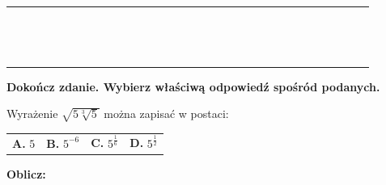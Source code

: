 \documentclass[12pt,a4paper]{article}
\theoremstyle{break}
\begin{document}
		\begin{tabular}{|p{0.1cm}|p{0.1cm}|p{0.1cm}|p{0.1cm}|p{0.1cm}|p{0.1cm}|p{0.1cm}|p{0.1cm}|p{0.1cm}|p{0.1cm}|p{0.1cm}|p{0.1cm}|p{0.1cm}|p{0.1cm}|p{0.1cm}|p{0.1cm}|p{0.1cm}|p{0.1cm}|p{0.1cm}|p{0.1cm}|p{0.1cm}|p{0.1cm}|p{0.1cm}|p{0.1cm}|p{0.1cm}|p{0.1cm}|p{0.1cm}|p{0.1cm}|p{0.1cm}|p{0.1cm}|p{0.1cm}|p{0.1cm}}
		\hline&&&&&&&&&&&&&&&&&&&&&&&&&&&&&&\\
		\hline&&&&&&&&&&&&&&&&&&&&&&&&&&&&&&\\
		\hline&&&&&&&&&&&&&&&&&&&&&&&&&&&&&&\\
		\hline&&&&&&&&&&&&&&&&&&&&&&&&&&&&&&\\
		\hline&&&&&&&&&&&&&&&&&&&&&&&&&&&&&&\\
		\hline&&&&&&&&&&&&&&&&&&&&&&&&&&&&&&\\
		\hline&&&&&&&&&&&&&&&&&&&&&&&&&&&&&&\\
		\hline&&&&&&&&&&&&&&&&&&&&&&&&&&&&&&\\
		\hline&&&&&&&&&&&&&&&&&&&&&&&&&&&&&&\\
		\hline&&&&&&&&&&&&&&&&&&&&&&&&&&&&&&\\
		\hline&&&&&&&&&&&&&&&&&&&&&&&&&&&&&&\\
		\hline&&&&&&&&&&&&&&&&&&&&&&&&&&&&&&\\
		\hline&&&&&&&&&&&&&&&&&&&&&&&&&&&&&&\\
		\hline&&&&&&&&&&&&&&&&&&&&&&&&&&&&&&\\
		\hline&&&&&&&&&&&&&&&&&&&&&&&&&&&&&&\\
		\hline
	\end{tabular}
	
	
	\begin{zad}[0-1]
		\textbf{Dokończ zdanie. Wybierz właściwą odpowiedź spośród podanych.}
	\end{zad} 
	
	Wyrażenie $\sqrt{5\sqrt[3]{5}}$ można zapisać w postaci:
	
	\vspace{0.5cm}
	\begin{tabular}{p{3.5cm} p{3.5cm} p{3.5cm} p{3.5cm}}
		\textbf{A. }$5$&
		\textbf{B. }$5^{-6}$&
		\textbf{C. }$5^\frac{1}{6}$&
		\textbf{D. }$5^\frac{1}{2}$\\
	\end{tabular}	

	
	\begin{zad}[0-3]
		\textbf{Oblicz:}
	\end{zad} 
	
\end{document}
